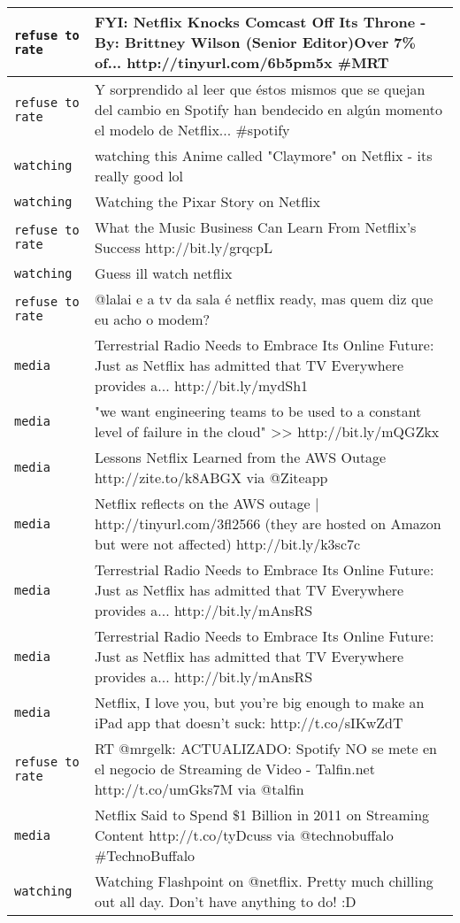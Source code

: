 {\begin{longtable}{|l|p{160mm}|}
      \tabularnewline\hline
         \texttt{refuse to rate} & FYI: Netflix Knocks Comcast Off Its Throne - By: Brittney Wilson (Senior Editor)Over 7\% of... http://tinyurl.com/6b5pm5x \#MRT
      \tabularnewline\hline
         \texttt{refuse to rate} & Y sorprendido al leer que éstos mismos que se quejan del cambio en Spotify han bendecido en algún momento el modelo de Netflix... \#spotify
      \tabularnewline\hline
         \texttt{watching} & watching this Anime called "Claymore" on Netflix - its really good lol
      \tabularnewline\hline
         \texttt{watching} & Watching the Pixar Story on Netflix
      \tabularnewline\hline
         \texttt{refuse to rate} & What the Music Business Can Learn From Netflix's Success http://bit.ly/grqcpL
      \tabularnewline\hline
         \texttt{watching} & Guess ill watch netflix
      \tabularnewline\hline
         \texttt{refuse to rate} & @lalai e a tv da sala é netflix ready, mas quem diz que eu acho o modem?
      \tabularnewline\hline
         \texttt{media} & Terrestrial Radio Needs to Embrace Its Online Future: Just as Netflix has admitted that TV Everywhere provides a... http://bit.ly/mydSh1
      \tabularnewline\hline
         \texttt{media} & "we want engineering teams to be used to a constant level of failure in the cloud" >> http://bit.ly/mQGZkx
      \tabularnewline\hline
         \texttt{media} & Lessons Netflix Learned from the AWS Outage http://zite.to/k8ABGX via @Ziteapp
      \tabularnewline\hline
         \texttt{media} & Netflix reflects on the AWS outage | http://tinyurl.com/3fl2566 (they are hosted on Amazon but were not affected) http://bit.ly/k3sc7c
      \tabularnewline\hline
         \texttt{media} & Terrestrial Radio Needs to Embrace Its Online Future: Just as Netflix has admitted that TV Everywhere provides a... http://bit.ly/mAnsRS
      \tabularnewline\hline
         \texttt{media} & Terrestrial Radio Needs to Embrace Its Online Future: Just as Netflix has admitted that TV Everywhere provides a... http://bit.ly/mAnsRS
      \tabularnewline\hline
         \texttt{media} & Netflix, I love you, but you're big enough to make an iPad app that doesn't suck: http://t.co/sIKwZdT
      \tabularnewline\hline
         \texttt{refuse to rate} & RT @mrgelk: ACTUALIZADO: Spotify NO se mete en el negocio de Streaming de Video - Talfin.net http://t.co/umGks7M via @talfin
      \tabularnewline\hline
         \texttt{media} & Netflix Said to Spend \$1 Billion in 2011 on Streaming Content http://t.co/tyDcuss via @technobuffalo \#TechnoBuffalo
      \tabularnewline\hline
         \texttt{watching} & Watching Flashpoint on @netflix. Pretty much chilling out all day. Don't have anything to do! :D

\end{longtable}}
